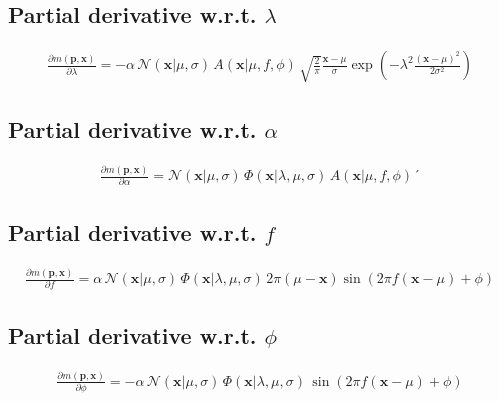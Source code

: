\documentclass{article}
\begin{document}
\subsection{Partial derivative w.r.t. $\lambda$}

\begin{align}
\frac{\partial m\left(\mathbf{p},\mathbf{x}\right)}{\partial \lambda} =
-\alpha\,\mathcal{N}(\mathbf{x}|\mu,\sigma) \, A(\mathbf{x}|\mu,f,\phi) \, \sqrt{\frac{2}{\pi}}\frac{\mathbf{x}-\mu}{\sigma}\exp\left(-\lambda^2\frac{(\mathbf{x}-\mu)^2}{2\sigma^2}
\right)
\end{align}

\subsection{Partial derivative w.r.t. $\alpha$}

\begin{align}
\frac{\partial m\left(\mathbf{p},\mathbf{x}\right)}{\partial \alpha} = \mathcal{N}(\mathbf{x}|\mu,\sigma) \, \Phi(\mathbf{x}|\lambda,\mu,\sigma) \, A(\mathbf{x}|\mu,f,\phi)´
\end{align}

\subsection{Partial derivative w.r.t. $f$}

\begin{align}
\frac{\partial m\left(\mathbf{p},\mathbf{x}\right)}{\partial f} = \alpha \, \mathcal{N}(\mathbf{x}|\mu,\sigma) \, \Phi(\mathbf{x}|\lambda,\mu,\sigma) \, 2 \pi \left(\mu-\mathbf{x}\right) \sin(2\pi f (\mathbf{x}-\mu)+\phi)
\end{align}

\subsection{Partial derivative w.r.t. $\phi$}

\begin{align}
\frac{\partial m\left(\mathbf{p},\mathbf{x}\right)}{\partial \phi} = -\alpha \, \mathcal{N}(\mathbf{x}|\mu,\sigma) \, \Phi(\mathbf{x}|\lambda,\mu,\sigma) \, \sin(2\pi f (\mathbf{x}-\mu)+\phi)
\end{align}
\end{document}
